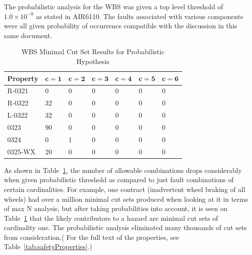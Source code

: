 The probabilistic analysis for the WBS was given a top level threshold of $1.0 \times 10^{-9}$ as stated in AIR6110. The faults associated with various components were all given probability of occurrence compatible with the discussion in this same document. 
\begin{center}
\begin{table}[htbp]
    \begin{tabular}{ | l | l | l | l | l | l | l | }
    \hline
    \textbf{Property} & $\bm{c = 1}$ & $\bm{c = 2}$ & $\bm{c = 3}$ & $\bm{c = 4}$ 
		& $\bm{c = 5}$ & $\bm{c = 6}$   \\ \hline \hline
    R-0321 & 0 & 0 & 0 & 0 & 0 & 0  \\ \hline
    R-0322 & 32 & 0 & 0 &0 &0 &0  \\ \hline
    L-0322 & 32 & 0 & 0 & 0 & 0 & 0   \\ \hline
    0323 & 90 & 0 & 0 & 0 & 0 & 0   \\ \hline
    0324 & 0 & 1 & 0 & 0 & 0 & 0  \\ \hline
    0325-WX & 20 & 0 & 0 &0 &0 & 0   \\ \hline
    \end{tabular}
    \caption{WBS Minimal Cut Set Results for Probabilistic Hypothesis}
    \label{tab:wbs_prob_results}
\end{table}
\end{center}
As shown in Table~\ref{tab:wbs_prob_results}, the number of allowable combinations drops considerably when given probabilistic threshold as compared to just fault combinations of certain cardinalities. For example, one contract (inadvertent wheel braking of all wheels) had over a million minimal cut sets produced when looking at it in terms of max N analysis, but after taking probabilities into account, it is seen on Table~\ref{tab:wbs_prob_results} that the likely contributors to a hazard are minimal cut sets of cardinality one. The probabilistic analysis eliminated many thousands of cut sets from consideration.( For the full text of the properties, see Table~\ref{tab:safetyProperties}.)

